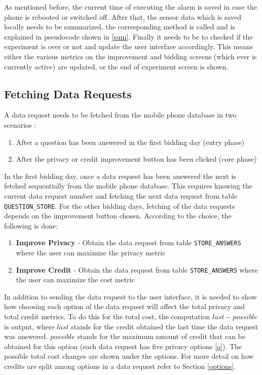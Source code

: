 As mentioned before, the current time of executing the alarm is saved in case the phone is rebooted or switched off. After that, the sensor data which is saved locally
needs to be summarized, the corresponding method is called and is explained in pseudocode shown in \ref{sum}. Finally it needs to be to checked if the experiment is over or not and update the user interface accordingly. This means either the various metrics on the improvement and bidding screens (which ever is currently active) are updated, or
the end of experiment screen is shown.

\subsection{Fetching Data Requests} \label{data_req}
A data request needs to be fetched from the mobile phone database in two scenarios :

\begin{enumerate}
	\item After a question has been answered in the first bidding day (entry phase)
	\item After the privacy or credit improvement button has been clicked (core phase)
\end{enumerate}

In the first bidding day, once a data request has been answered the next is fetched sequentially from the mobile phone database. This requires knowing the current data request number and fetching the next data request from table \texttt{QUESTION\_STORE}. For the other bidding days, fetching of the data requests depends on the improvement button chosen. According to the choice, the following is done:

\begin{enumerate}
	\item \textbf{Improve Privacy} - Obtain the data request from table \texttt{STORE\_ANSWERS} where the user can maximize the privacy metric
	\item \textbf{Improve Credit} - Obtain the data request from table \texttt{STORE\_ANSWERS} where the user can maximize the cost metric
\end{enumerate}

In addition to sending the data request to the user interface, it is needed to show how choosing each option of the data request will affect the total privacy and total credit metrics. To do this for the total cost, the computation $last-possible$ is output, where $last$ stands for the credit obtained the last time the data request was answered. $possible$ stands for the maximum amount of credit that can be obtained for this option (each data request has five privacy options \ref{o}). The possible total cost changes are shown under the options. For more detail on how credits are split among options in a data request refer to Section \ref{options}.

